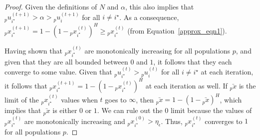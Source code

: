 \documentclass{acm_proc_article-sp}
\begin{document}
\begin{proof}
Given the definitions of $N$ and $\alpha$, this also implies that ${_p}u^{(t+1)}_{i^\star} > \alpha > {_p}u^{(t+1)}_{i}$ for all $i \neq i^\star$.  As a consequence, \mbox{${_p}x^{(t+1)}_{i^\star} = 1 -  \left( 1 - {_p}x^{(t)}_{i^\star} \right)^H \geq {_p}x^{(t)}_{i^\star}$} (from Equation~\ref{approx_eqn1}).

Having shown that ${_p}x^{(t)}_{i^\star}$ are monotonically increasing for all populations $p$, and given that they are all bounded between $0$ and $1$, it follows that they each converge to some value.  Given that ${_p}u^{(t)}_{i^\star} > {_p}u^{(t)}_i$ for all $i \neq i^\star$ at each iteration, it follows that ${_p}x^{(t+1)}_{i^\star} = 1 - \left( 1 - {_p}x^{(t)}_{i^\star} \right)^H$ at each iteration as well.  If $\bar{{_p}x}$ is the limit of the ${_p}x^{(t)}_{i^\star}$ values when $t$ goes to $\infty$, then $\bar{{_p}x} = 1 - \left( 1 - \bar{{_p}x} \right)^H$, which implies that $\bar{{_p}x}$ is either $0$ or $1$.  We can rule out the $0$ limit because the values of ${_p}x^{(t)}_{i^\star}$ are monotonically increasing and ${_p}x^{(0)}_{i^\star}>\eta_\epsilon$.  Thus, ${_p}x^{(t)}_{i^\star}$ converges to $1$ for all populations $p$.\end{proof}




 
\end{document}
